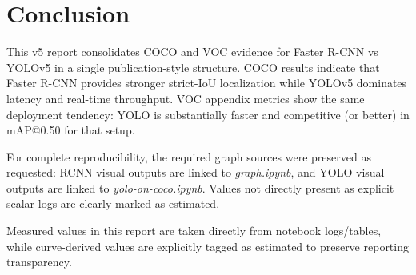 \documentclass[conference]{IEEEtran}
\begin{document}
\section{Conclusion}
This v5 report consolidates COCO and VOC evidence for Faster R-CNN vs YOLOv5 in a single publication-style structure. COCO results indicate that Faster R-CNN provides stronger strict-IoU localization while YOLOv5 dominates latency and real-time throughput. VOC appendix metrics show the same deployment tendency: YOLO is substantially faster and competitive (or better) in mAP@0.50 for that setup.

For complete reproducibility, the required graph sources were preserved as requested: RCNN visual outputs are linked to \textit{graph.ipynb}, and YOLO visual outputs are linked to \textit{yolo-on-coco.ipynb}. Values not directly present as explicit scalar logs are clearly marked as estimated.

Measured values in this report are taken directly from notebook logs/tables, while curve-derived values are explicitly tagged as estimated to preserve reporting transparency.
\end{document}
